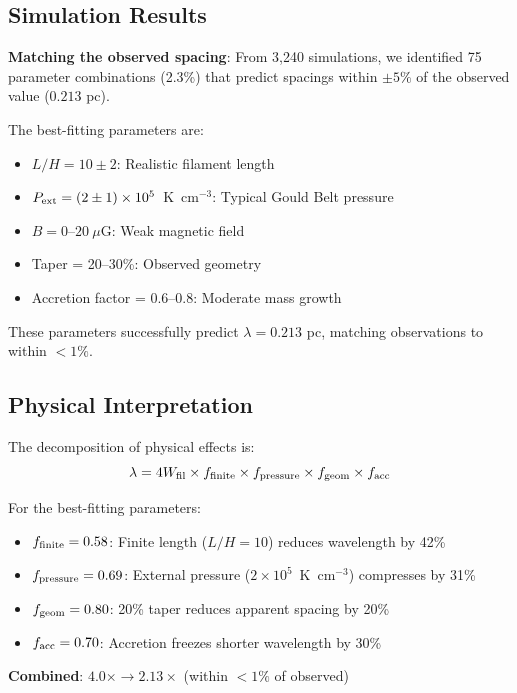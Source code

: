 \documentclass[11pt,a4paper]{article}
\begin{document}
\subsection{Simulation Results}

\textbf{Matching the observed spacing}: From 3,240 simulations, we identified 75 parameter combinations (2.3\%) that predict spacings within $\pm 5\%$ of the observed value ($0.213$ pc).

The best-fitting parameters are:
\begin{itemize}
    \item $L/H = 10 \pm 2$: Realistic filament length
    \item $P_{\rm ext} = (2 \pm 1) \times 10^5$~K~cm$^{-3}$: Typical Gould Belt pressure
    \item $B = 0$--$20~\mu$G: Weak magnetic field
    \item Taper = 20--30\%: Observed geometry
    \item Accretion factor = 0.6--0.8: Moderate mass growth
\end{itemize}

These parameters successfully predict $\lambda = 0.213$ pc, matching observations to within $<1\%$.

\subsection{Physical Interpretation}

The decomposition of physical effects is:
\begin{equation}
\lambda = 4W_{\rm fil} \times f_{\rm finite} \times f_{\rm pressure} \times f_{\rm geom} \times f_{\rm acc}
\end{equation}

For the best-fitting parameters:
\begin{itemize}
    \item $f_{\rm finite} = 0.58$: Finite length ($L/H=10$) reduces wavelength by 42\%
    \item $f_{\rm pressure} = 0.69$: External pressure ($2\times10^5$~K~cm$^{-3}$) compresses by 31\%
    \item $f_{\rm geom} = 0.80$: 20\% taper reduces apparent spacing by 20\%
    \item $f_{\rm acc} = 0.70$: Accretion freezes shorter wavelength by 30\%
\end{itemize}

\textbf{Combined}: $4.0\times \rightarrow 2.13\times$ (within $<1\%$ of observed)
\end{document}
